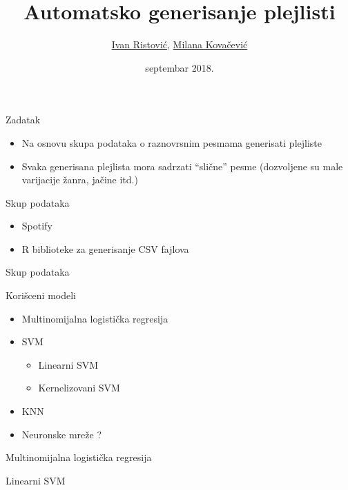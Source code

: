 \documentclass{beamer}
\title{Automatsko generisanje plejlisti}
\author{\href{mailto:mi14031@matf.bg.ac.rs}{Ivan Ristović}, \href{mailto:mi14042@matf.bg.ac.rs}{Milana Kovačević}
}
\date{septembar 2018.}
\begin{document}
\begin{frame}
    \titlepage
\end{frame}

\begin{frame}{Zadatak}
    \begin{itemize}
        \item Na osnovu skupa podataka o raznovrsnim pesmama generisati plejliste
        \item Svaka generisana plejlista mora sadrzati ``sli\v{c}ne'' pesme (dozvoljene su male varijacije \v{z}anra, ja\v{c}ine itd.)
    \end{itemize}
\end{frame}

\begin{frame}{Skup podataka}
    \begin{itemize}
        \item Spotify
        \item R biblioteke za generisanje CSV fajlova
    \end{itemize}
\end{frame}

\begin{frame}{Skup podataka}
\end{frame}

\begin{frame}{Kori\v{s}ceni modeli}
    \begin{itemize}
        \item Multinomijalna logisti\v{c}ka regresija
        \item SVM
        \begin{itemize}
            \item Linearni SVM
            \item Kernelizovani SVM
        \end{itemize}
        \item KNN
        \item Neuronske mre\v{z}e ?
    \end{itemize}
\end{frame}

\begin{frame}{Multinomijalna logisti\v{c}ka regresija}
\end{frame}

\begin{frame}{Linearni SVM}
\end{frame}
\end{document}
